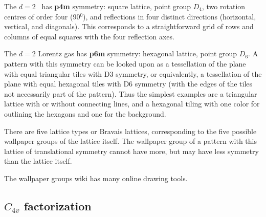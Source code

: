 
The $d=2$ \catlatt\ has \textbf{p4m} symmetry:
square lattice, point group $D_4$, two rotation centres of order four (90${}^0$),
and reflections in four distinct directions (horizontal, vertical, and
diagonals). This corresponds to a straightforward grid of rows and columns of
equal squares with the four reflection axes.

The $d=2$ Lorentz gas has \textbf{p6m} symmetry: hexagonal lattice, point group
$D_6$. A pattern with this symmetry can be looked upon as a tessellation of the
plane with equal triangular tiles with D3 symmetry, or equivalently, a
tessellation of the plane with equal hexagonal tiles with D6 symmetry (with the
edges of the tiles not necessarily part of the pattern). Thus the simplest
examples are a triangular lattice with or without connecting lines, and a
hexagonal tiling with one color for outlining the hexagons and one for the
background.

There are five lattice types or Bravais lattices, corresponding to the five
possible wallpaper groups of the lattice itself. The wallpaper group of a
pattern with this lattice of translational symmetry cannot have more, but may
have less symmetry than the lattice itself.

The wallpaper groups 
{wiki} has many online drawing tools.
                                                        \toCB

\subsection{$C_{4v}$ factorization}
\label{C-4v-inva}

